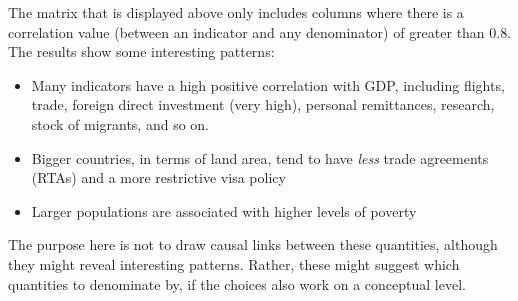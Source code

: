 \documentclass[
]{book}
\newenvironment{Shaded}{\begin{snugshade}}{\end{snugshade}}
\newcommand{\CommentTok}[1]{\textcolor[rgb]{0.56,0.35,0.01}{\textit{#1}}}
\newcommand{\DataTypeTok}[1]{\textcolor[rgb]{0.13,0.29,0.53}{#1}}
\newcommand{\DecValTok}[1]{\textcolor[rgb]{0.00,0.00,0.81}{#1}}
\newcommand{\FloatTok}[1]{\textcolor[rgb]{0.00,0.00,0.81}{#1}}
\newcommand{\KeywordTok}[1]{\textcolor[rgb]{0.13,0.29,0.53}{\textbf{#1}}}
\newcommand{\NormalTok}[1]{#1}
\newcommand{\OperatorTok}[1]{\textcolor[rgb]{0.81,0.36,0.00}{\textbf{#1}}}
\newcommand{\StringTok}[1]{\textcolor[rgb]{0.31,0.60,0.02}{#1}}
\providecommand{\tightlist}{%
  \setlength{\itemsep}{0pt}\setlength{\parskip}{0pt}}
\begin{document}
\begin{Shaded}
\end{Shaded}

The matrix that is displayed above only includes columns where there is a correlation value (between an indicator and any denominator) of greater than 0.8. The results show some interesting patterns:

\begin{itemize}
\tightlist
\item
  Many indicators have a high positive correlation with GDP, including flights, trade, foreign direct investment (very high), personal remittances, research, stock of migrants, and so on.
\item
  Bigger countries, in terms of land area, tend to have \emph{less} trade agreements (RTAs) and a more restrictive visa policy
\item
  Larger populations are associated with higher levels of poverty
\end{itemize}

The purpose here is not to draw causal links between these quantities, although they might reveal interesting patterns. Rather, these might suggest which quantities to denominate by, if the choices also work on a conceptual level.
\end{document}
